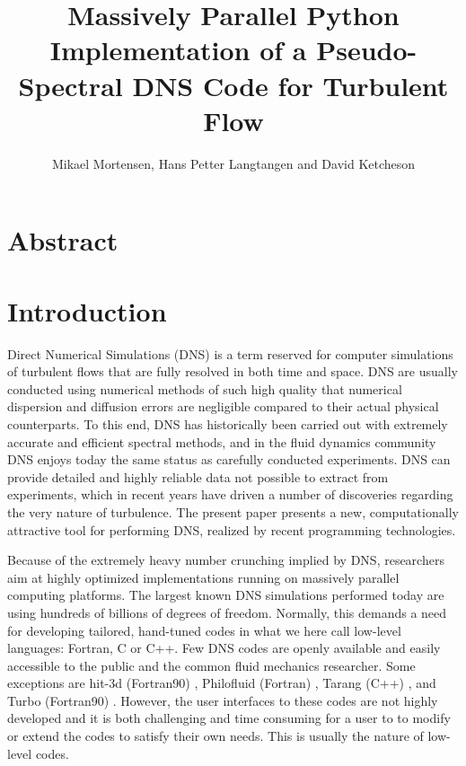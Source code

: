 \documentclass[11pt, oneside]{article}
\title{Massively Parallel Python Implementation of a Pseudo-Spectral DNS Code for Turbulent Flow}
\author{Mikael Mortensen, Hans Petter Langtangen and David Ketcheson}
\begin{document}
\maketitle
\section{Abstract}

\section{Introduction}
Direct Numerical Simulations (DNS) is a term reserved for computer simulations of turbulent flows that are fully resolved in both time and space. DNS are usually conducted using numerical methods of such high quality that numerical dispersion and diffusion errors are negligible compared to their actual physical counterparts. To this end, DNS has historically been carried out with extremely accurate and efficient spectral methods, and in the fluid dynamics community DNS enjoys  today the same status as carefully conducted experiments. DNS can provide detailed and highly reliable data not possible to extract from experiments, which in recent years have driven a number of discoveries regarding the very nature of turbulence. The present paper presents a new, computationally attractive tool for performing DNS, realized by recent programming technologies.

Because of the extremely heavy number crunching implied by DNS,
researchers aim at highly optimized implementations running on
massively parallel computing platforms. The largest known DNS
simulations performed today are using hundreds of billions of degrees
of freedom. Normally, this demands a need for developing tailored, hand-tuned
codes in what we here call low-level languages: Fortran, C or C++. Few
DNS codes are openly available and easily accessible to the public and
the common fluid mechanics researcher. Some exceptions are hit-3d
(Fortran90) \cite{hit-3d}, Philofluid (Fortran) \cite{philofluid},
Tarang (C++) \cite{tarang}, and Turbo (Fortran90)
\cite{turbo}. However, the user interfaces to these codes are not highly developed and it is both challenging and time consuming for a user to to modify or extend the codes to satisfy their own needs. This is usually the nature of low-level codes.
\end{document}
